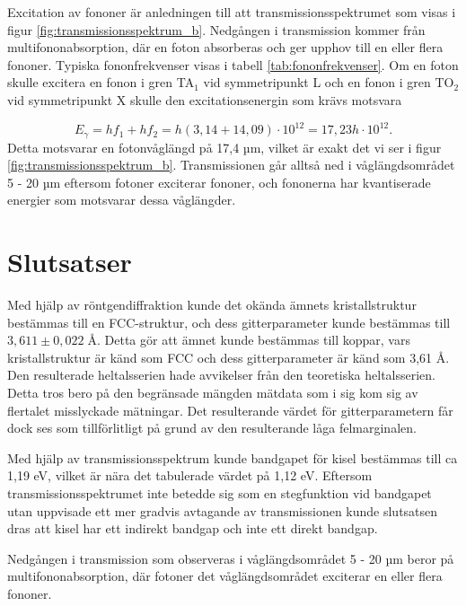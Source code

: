 \documentclass[12pt, a4paper]{article}
\begin{document}
Excitation av fononer är anledningen till att transmissionsspektrumet som visas i figur \ref{fig:transmissionsspektrum_b}.
Nedgången i transmission kommer från multifononabsorption, där en foton absorberas och ger upphov till en eller flera fononer.
Typiska fononfrekvenser visas i tabell \ref{tab:fononfrekvenser}.
Om en foton skulle excitera en fonon i gren TA$_1$ vid symmetripunkt L och en fonon i gren TO$_2$ vid symmetripunkt X skulle den excitationsenergin som krävs motsvara

\begin{equation}
    E_\gamma = hf_1 + hf_2 = h(3,14 + 14,09) \cdot 10^{12} = 17,23h \cdot 10^{12}.
\end{equation}
Detta motsvarar en fotonvåglängd på 17,4 µm, vilket är exakt det vi ser i figur \ref{fig:transmissionsspektrum_b}.
Transmissionen går alltså ned i våglängdsområdet 5 - 20 µm eftersom fotoner exciterar fononer, 
och fononerna har kvantiserade energier som motsvarar dessa våglängder.
\section{Slutsatser}

Med hjälp av röntgendiffraktion kunde det okända ämnets kristallstruktur bestämmas till en FCC-struktur,
och dess gitterparameter kunde bestämmas till $3,611 \pm 0,022 \; \text{Å}$.
Detta gör att ämnet kunde bestämmas till koppar, 
vars kristallstruktur är känd som FCC och dess gitterparameter är känd som 3,61 Å.
Den resulterade heltalsserien hade avvikelser från den teoretiska heltalsserien.
Detta tros bero på den begränsade mängden mätdata som i sig kom sig av flertalet misslyckade mätningar.
Det resulterande värdet för gitterparametern får dock ses som tillförlitligt på grund av den resulterande låga felmarginalen.

Med hjälp av transmissionsspektrum kunde bandgapet för kisel bestämmas till ca 1,19 eV, vilket är nära det tabulerade värdet på 1,12 eV.
Eftersom transmissionsspektrumet inte betedde sig som en stegfunktion vid bandgapet utan uppvisade ett mer gradvis avtagande av transmissionen 
kunde slutsatsen dras att kisel har ett indirekt bandgap och inte ett direkt bandgap.

Nedgången i transmission som observeras i våglängdsområdet 5 - 20 µm beror på multifononabsorption, 
där fotoner det våglängdsområdet exciterar en eller flera fononer.

\newpage

\printbibliography
\end{document}
